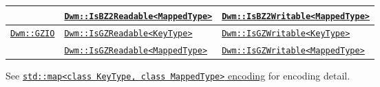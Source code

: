 \begin{minipage}{\textwidth}
\begin{small}
\begin{tabular}{lll}
 & \hyperref[concept:DwmIsBZ2Readable]{\texttt{Dwm::IsBZ2Readable<MappedType>}} & \hyperref[concept:DwmIsBZ2Writable]{\texttt{Dwm::IsBZ2Writable<MappedType>}} \\ \hline
\multirow{2}{*}{\hyperref[section:DwmGZIOClass]{\texttt{Dwm::GZIO}}} & \hyperref[concept:DwmIsGZReadable]{\texttt{Dwm::IsGZReadable<KeyType>}} & \hyperref[concept:DwmIsGZWritable]{\texttt{Dwm::IsGZWritable<KeyType>}} \\
 & \hyperref[concept:DwmIsGZReadable]{\texttt{Dwm::IsGZReadable<MappedType>}} & \hyperref[concept:DwmIsGZWritable]{\texttt{Dwm::IsGZWritable<MappedType>}} \\
\end{tabular}
\end{small}
\vspace{1ex}

See \hyperref[encoding:stdMap]{\texttt{std::map<class KeyType,%
 class MappedType>} encoding} for encoding detail.
\end{minipage}

